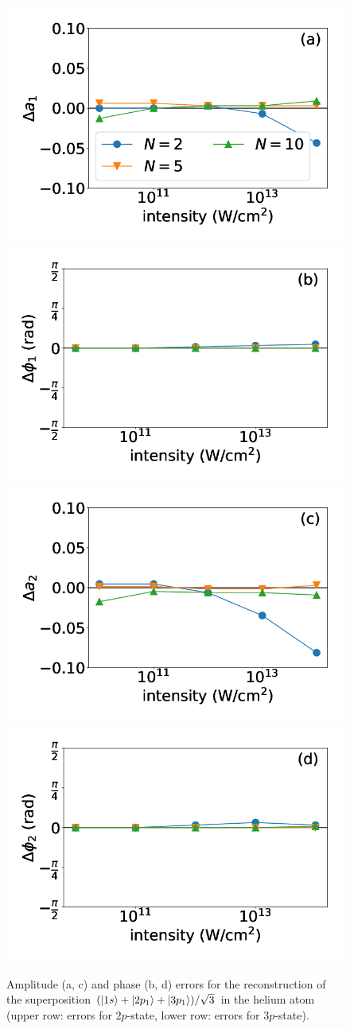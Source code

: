 \begin{figure}[!ht]
\centering
\includegraphics[width=0.48\linewidth]{figs/Photo_ionization/superpositions/Venzke_new_fig_10a.png}
\includegraphics[width=0.48\linewidth]{figs/Photo_ionization/superpositions/Venzke_new_fig_10b.png}\\
\includegraphics[width=0.48\linewidth]{figs/Photo_ionization/superpositions/Venzke_new_fig_10c.png}
\includegraphics[width=0.48\linewidth]{figs/Photo_ionization/superpositions/Venzke_new_fig_10d.png}

\caption{
Amplitude (a, c) and phase (b, d) errors for the reconstruction of the superposition $(\ket{1s}+\ket{2p_1}+\ket{3p_1})/\sqrt{3}$ in the helium atom (upper row: errors for $2p$-state, lower row: errors for $3p$-state). 
} 
  \label{fig:3-state}
\end{figure}

